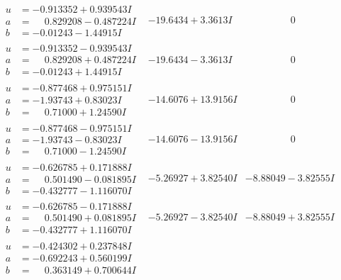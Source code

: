 \documentclass[1p]{elsarticle_modified}
\theoremstyle{definition}
\begin{document}
$$\begin{array}{c|c|c}
 \hline 
\begin{aligned}
u &= -0.913352 + 0.939543 I \\
a &= \phantom{-}0.829208 - 0.487224 I \\
b &= -0.01243 - 1.44915 I\end{aligned}
 & -19.6434 + 3.3613 I & \phantom{-0.000000 } 0 \\ \hline\begin{aligned}
u &= -0.913352 - 0.939543 I \\
a &= \phantom{-}0.829208 + 0.487224 I \\
b &= -0.01243 + 1.44915 I\end{aligned}
 & -19.6434 - 3.3613 I & \phantom{-0.000000 } 0 \\ \hline\begin{aligned}
u &= -0.877468 + 0.975151 I \\
a &= -1.93743 + 0.83023 I \\
b &= \phantom{-}0.71000 + 1.24590 I\end{aligned}
 & -14.6076 + 13.9156 I & \phantom{-0.000000 } 0 \\ \hline\begin{aligned}
u &= -0.877468 - 0.975151 I \\
a &= -1.93743 - 0.83023 I \\
b &= \phantom{-}0.71000 - 1.24590 I\end{aligned}
 & -14.6076 - 13.9156 I & \phantom{-0.000000 } 0 \\ \hline\begin{aligned}
u &= -0.626785 + 0.171888 I \\
a &= \phantom{-}0.501490 - 0.081895 I \\
b &= -0.432777 - 1.116070 I\end{aligned}
 & -5.26927 + 3.82540 I & -8.88049 - 3.82555 I \\ \hline\begin{aligned}
u &= -0.626785 - 0.171888 I \\
a &= \phantom{-}0.501490 + 0.081895 I \\
b &= -0.432777 + 1.116070 I\end{aligned}
 & -5.26927 - 3.82540 I & -8.88049 + 3.82555 I \\ \hline\begin{aligned}
u &= -0.424302 + 0.237848 I \\
a &= -0.692243 + 0.560199 I \\
b &= \phantom{-}0.363149 + 0.700644 I\end{aligned}

\end{array}$$
\end{document}

